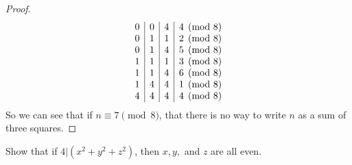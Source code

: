 \documentclass[11pt]{article}
\newenvironment{problem}[2][Problem]{\begin{trivlist}
\item[\hskip \labelsep {\bfseries #1}\hskip \labelsep {\bfseries #2.}]}{\end{trivlist}}
\begin{document}
\begin{proof}
\[\begin{array}{c|c|c| c@{}c}
      0   & 0   & 4   & 4               & \pmod{8} \\
      0   & 1   & 1   & 2               & \pmod{8} \\
      0   & 1   & 4   & 5               & \pmod{8} \\
      1   & 1   & 1   & 3               & \pmod{8} \\
      1   & 1   & 4   & 6               & \pmod{8} \\
      1   & 4   & 4   & 1               & \pmod{8} \\
      4   & 4   & 4   & 4               & \pmod{8} \\
    \end{array}
  \]
  So we can see that if $n\equiv 7\pmod{8}$, that there is no way to write $n$ as a sum of three squares.
\end{proof}

\begin{problem}{(b)}
Show that if $4|(x^2+y^2+z^2)$, then $x,y,$ and $z$ are all even.
\end{problem}
\end{document}
